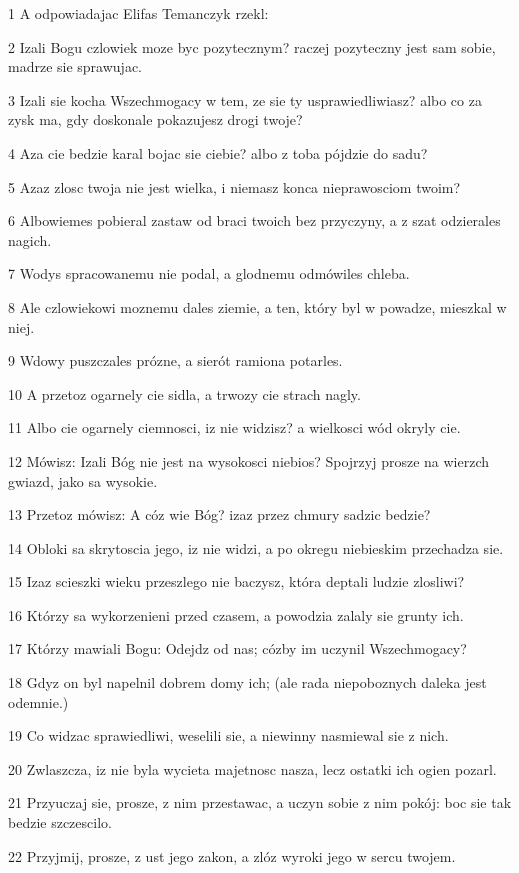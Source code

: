 \par 1 A odpowiadajac Elifas Temanczyk rzekl:
\par 2 Izali Bogu czlowiek moze byc pozytecznym? raczej pozyteczny jest sam sobie, madrze sie sprawujac.
\par 3 Izali sie kocha Wszechmogacy w tem, ze sie ty usprawiedliwiasz? albo co za zysk ma, gdy doskonale pokazujesz drogi twoje?
\par 4 Aza cie bedzie karal bojac sie ciebie? albo z toba pójdzie do sadu?
\par 5 Azaz zlosc twoja nie jest wielka, i niemasz konca nieprawosciom twoim?
\par 6 Albowiemes pobieral zastaw od braci twoich bez przyczyny, a z szat odzierales nagich.
\par 7 Wodys spracowanemu nie podal, a glodnemu odmówiles chleba.
\par 8 Ale czlowiekowi moznemu dales ziemie, a ten, który byl w powadze, mieszkal w niej.
\par 9 Wdowy puszczales prózne, a sierót ramiona potarles.
\par 10 A przetoz ogarnely cie sidla, a trwozy cie strach nagly.
\par 11 Albo cie ogarnely ciemnosci, iz nie widzisz? a wielkosci wód okryly cie.
\par 12 Mówisz: Izali Bóg nie jest na wysokosci niebios? Spojrzyj prosze na wierzch gwiazd, jako sa wysokie.
\par 13 Przetoz mówisz: A cóz wie Bóg? izaz przez chmury sadzic bedzie?
\par 14 Obloki sa skrytoscia jego, iz nie widzi, a po okregu niebieskim przechadza sie.
\par 15 Izaz scieszki wieku przeszlego nie baczysz, która deptali ludzie zlosliwi?
\par 16 Którzy sa wykorzenieni przed czasem, a powodzia zalaly sie grunty ich.
\par 17 Którzy mawiali Bogu: Odejdz od nas; cózby im uczynil Wszechmogacy?
\par 18 Gdyz on byl napelnil dobrem domy ich; (ale rada niepoboznych daleka jest odemnie.)
\par 19 Co widzac sprawiedliwi, weselili sie, a niewinny nasmiewal sie z nich.
\par 20 Zwlaszcza, iz nie byla wycieta majetnosc nasza, lecz ostatki ich ogien pozarl.
\par 21 Przyuczaj sie, prosze, z nim przestawac, a uczyn sobie z nim pokój: boc sie tak bedzie szczescilo.
\par 22 Przyjmij, prosze, z ust jego zakon, a zlóz wyroki jego w sercu twojem.
